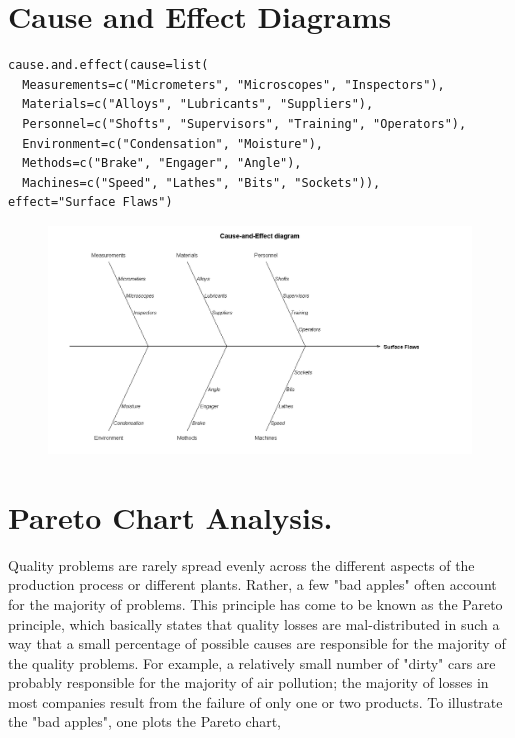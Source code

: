 \documentclass[a4paper,12pt]{article}
\begin{document}
\tableofcontents
\newpage
\section{Cause and Effect Diagrams}

\begin{framed}
\begin{verbatim}
cause.and.effect(cause=list(
  Measurements=c("Micrometers", "Microscopes", "Inspectors"),
  Materials=c("Alloys", "Lubricants", "Suppliers"),
  Personnel=c("Shofts", "Supervisors", "Training", "Operators"),
  Environment=c("Condensation", "Moisture"),
  Methods=c("Brake", "Engager", "Angle"),
  Machines=c("Speed", "Lathes", "Bits", "Sockets")),
effect="Surface Flaws")
\end{verbatim}
\end{framed}
\begin{figure}[h!]
\centering
\includegraphics[width=0.7\linewidth]{./qccfishbone}
\caption{}
\label{fig:qccfishbone}
\end{figure}

\newpage
\section{Pareto Chart Analysis.}
 Quality problems are rarely spread evenly across the different aspects of the production process or different plants. Rather, a few "bad apples" often account for the majority of problems. This principle has come to be known as the Pareto principle, which basically states that quality losses are mal-distributed in such a way that a small percentage of possible causes are responsible for the majority of the quality problems. For example, a relatively small number of "dirty" cars are probably responsible for the majority of air pollution; the majority of losses in most companies result from the failure of only one or two products. To illustrate the "bad apples", one plots the Pareto chart,
\newpage
\end{document}
